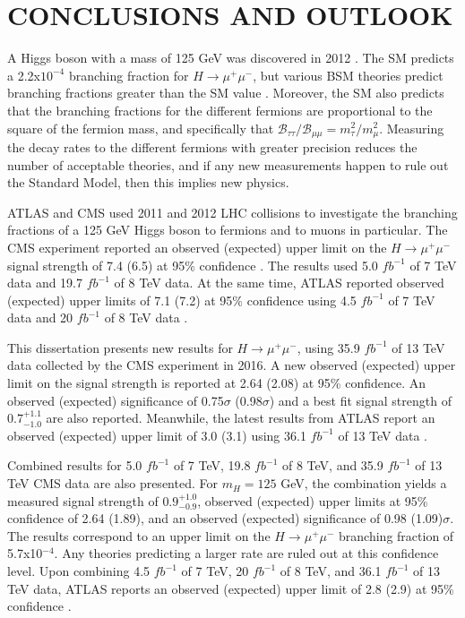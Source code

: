 \chapter{CONCLUSIONS AND OUTLOOK} \label{conclusions}

A Higgs boson with a mass of 125 GeV was discovered in 2012 \cite{atlasdiscovery,cmsdiscovery2012,cmsdiscovery2013}. The SM predicts a 2.2x$10^{-4}$ branching fraction for $H\rightarrow\mu^+\mu^-$, but various BSM theories predict branching fractions greater than the SM value \cite{gtsm1, gtsm2, gtsm3}. Moreover, the SM also predicts that the branching fractions for the different fermions are proportional to the square of the fermion mass, and specifically that $\mathcal{B}_{\tau\tau}/\mathcal{B}_{\mu\mu} = m^2_\tau/m^2_\mu$. Measuring the decay rates to the different fermions with greater precision reduces the number of acceptable theories, and if any new measurements happen to rule out the Standard Model, then this implies new physics.  

ATLAS and CMS used 2011 and 2012 LHC collisions to investigate the branching fractions of a 125 GeV Higgs boson to fermions and to muons in particular. The CMS experiment reported an observed (expected) upper limit on the $H\rightarrow\mu^+\mu^-$ signal strength of 7.4 (6.5) at 95\% confidence \cite{cmshmumu2012}. The results used 5.0 $fb^{-1}$ of 7 TeV data and 19.7 $fb^{-1}$ of 8 TeV data. At the same time, ATLAS reported observed (expected) upper limits of 7.1 (7.2) at 95\% confidence using 4.5 $fb^{-1}$ of 7 TeV data and 20 $fb^{-1}$ of 8 TeV data \cite{atlashmumu2012}. 

This dissertation presents new results for $H\rightarrow\mu^+\mu^-$, using 35.9 $fb^{-1}$ of 13 TeV data collected by the CMS experiment in 2016. A new observed (expected) upper limit on the signal strength is reported at 2.64 (2.08) at 95\% confidence. An observed (expected) significance of 0.75$\sigma$ (0.98$\sigma$)  and a best fit signal strength of $0.7^{+1.1}_{-1.0}$ are also reported. Meanwhile, the latest results from ATLAS report an observed (expected) upper limit of 3.0 (3.1) using 36.1 $fb^{-1}$ of 13 TeV data \cite{atlashmumu2017}. 

Combined results for 5.0 $fb^{-1}$ of 7 TeV, 19.8 $fb^{-1}$ of 8 TeV, and 35.9 $fb^{-1}$ of 13 TeV CMS data are also presented. For $m_H=125$ GeV, the combination yields a measured signal strength of $0.9^{+1.0}_{-0.9}$, observed (expected) upper limits at 95\% confidence of 2.64 (1.89), and an observed (expected) significance of 0.98 (1.09)$\sigma$. The results correspond to an upper limit on the $H\rightarrow\mu^+\mu^-$ branching fraction of 5.7x10$^{-4}$. Any theories predicting a larger rate are ruled out at this confidence level. Upon combining 4.5 $fb^{-1}$ of 7 TeV, 20 $fb^{-1}$ of 8 TeV, and 36.1 $fb^{-1}$ of 13 TeV data, ATLAS reports an observed (expected) upper limit of 2.8 (2.9) at 95\% confidence \cite{atlashmumu2017}.

